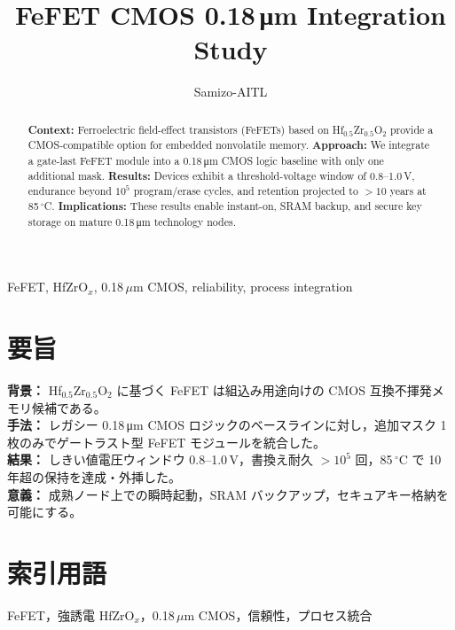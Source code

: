 \documentclass[journal]{IEEEtran}
\begin{document}
\title{FeFET CMOS 0.18\,\si{\micro\meter} Integration Study}
\author{Samizo-AITL}
\maketitle

\begin{abstract}
\noindent
\textbf{Context:} Ferroelectric field-effect transistors (FeFETs) based on Hf$_{0.5}$Zr$_{0.5}$O$_2$ provide a CMOS-compatible option for embedded nonvolatile memory. 
\textbf{Approach:} We integrate a gate-last FeFET module into a 0.18\,\si{\micro\meter} CMOS logic baseline with only one additional mask. 
\textbf{Results:} Devices exhibit a threshold-voltage window of 0.8--1.0\,V, endurance beyond $10^5$ program/erase cycles, and retention projected to $>10$ years at 85\,$^\circ$C. 
\textbf{Implications:} These results enable instant-on, SRAM backup, and secure key storage on mature 0.18\,\si{\micro\meter} technology nodes.
\end{abstract}

\begin{IEEEkeywords}
FeFET, HfZrO$_x$, 0.18\,$\mu$m CMOS, reliability, process integration
\end{IEEEkeywords}

\section*{要旨}
\noindent
\textbf{背景：} Hf$_{0.5}$Zr$_{0.5}$O$_2$ に基づく FeFET は組込み用途向けの CMOS 互換不揮発メモリ候補である。\\
\textbf{手法：} レガシー 0.18\,\si{\micro\meter} CMOS ロジックのベースラインに対し，追加マスク 1 枚のみでゲートラスト型 FeFET モジュールを統合した。\\
\textbf{結果：} しきい値電圧ウィンドウ 0.8--1.0\,V，書換え耐久 $>10^5$ 回，85\,$^\circ$C で 10 年超の保持を達成・外挿した。\\
\textbf{意義：} 成熟ノード上での瞬時起動，SRAM バックアップ，セキュアキー格納を可能にする。

\section*{索引用語}
FeFET，強誘電 HfZrO$_x$，0.18\,$\mu$m CMOS，信頼性，プロセス統合

\end{document}
